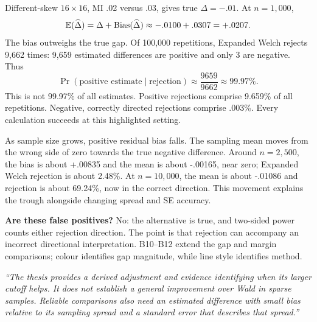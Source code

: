 Different-skew \(16\times16\), MI .02 versus .03, gives true \(\Delta=-.01\). At \(n=1{,}000\),
\[
\mathbb E(\widehat\Delta)=\Delta+\operatorname{Bias}(\widehat\Delta)
\approx-.0100+.0307=+.0207.
\]
The bias outweighs the true gap. Of 100,000 repetitions, Expanded Welch rejects 9,662 times: 9,659 estimated differences are positive and only 3 are negative. Thus
\[
\Pr(\text{positive estimate}\mid\text{rejection})
\approx\frac{9659}{9662}\approx99.97\%.
\]
This is not 99.97\% of all estimates. Positive rejections comprise 9.659\% of all repetitions. Negative, correctly directed rejections comprise .003\%. Every calculation succeeds at this highlighted setting.

As sample size grows, positive residual bias falls. The sampling mean moves from the wrong side of zero towards the true negative difference. Around \(n=2{,}500\), the bias is about +.00835 and the mean is about -.00165, near zero; Expanded Welch rejection is about 2.48\%. At \(n=10{,}000\), the mean is about -.01086 and rejection is about 69.24\%, now in the correct direction. This movement explains the trough alongside changing spread and SE accuracy.

\textbf{Are these false positives?} No: the alternative is true, and two-sided power counts either rejection direction. The point is that rejection can accompany an incorrect directional interpretation. B10--B12 extend the gap and margin comparisons; colour identifies gap magnitude, while line style identifies method.

\newpage
{}

\emph{``The thesis provides a derived adjustment and evidence identifying when its larger cutoff helps. It does not establish a general improvement over Wald in sparse samples. Reliable comparisons also need an estimated difference with small bias relative to its sampling spread and a standard error that describes that spread.''}

